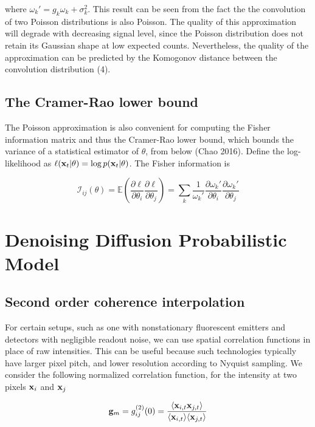 \documentclass{article}
\begin{document}
where $\omega_{k}' = g_{k}\omega_{k} + \sigma_{k}^{2}$. This result can be seen from the fact the the convolution of two Poisson distributions is also Poisson. The quality of this approximation will degrade with decreasing signal level, since the Poisson distribution does not retain its Gaussian shape at low expected counts. Nevertheless, the quality of the approximation can be predicted by the Komogonov distance between the convolution distribution (4).

\subsection{The Cramer-Rao lower bound}

The Poisson approximation is also convenient for computing the Fisher information matrix and thus the Cramer-Rao lower bound, which bounds the variance of a statistical estimator of $\theta$, from below (Chao 2016). Define the log-likelihood as $\ell (\bold{x}_{t}|\theta) = \log p(\bold{x}_{t}|\theta)$. The Fisher information is

\begin{equation}
\mathcal{I}_{ij}(\theta) = \mathbb{E}\left(\frac{\partial \ell}{\partial\theta_{i}}\frac{\partial\ell}{\partial\theta_{j}}\right) = \sum_{k}\frac{1}{\omega_{k}'}\frac{\partial \omega_{k}'}{\partial\theta_{i}}\frac{\partial \omega_{k}'}{\partial\theta_{j}}
\end{equation}


\section{Denoising Diffusion Probabilistic Model}

\subsection{Second order coherence interpolation}

For certain setups, such as one with nonstationary fluorescent emitters and detectors with negligible readout noise, we can use spatial correlation functions in place of raw intensities. This can be useful because such technologies typically have larger pixel pitch, and lower resolution according to Nyquist sampling. We consider the following normalized correlation function, for the intensity at two pixels $\bold{x}_{i}$ and $\bold{x}_{j}$

\begin{equation}
\bold{g}_{m} = g^{(2)}_{ij}(0) = \frac{\langle \bold{x}_{i,t}\bold{x}_{j,t}\rangle}{\langle \bold{x}_{i,t}\rangle\langle \bold{x}_{j,t}\rangle}
\end{equation}
\end{document}
